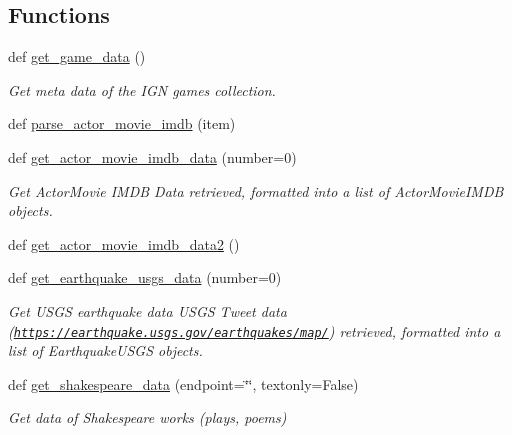 \subsection*{Functions}
\begin{DoxyCompactItemize}
\item 
def \hyperlink{namespacebridges_1_1data__src__dependent_1_1data__source_a31b64b8c7a42cdfca0a5f0ae3da187d2}{get\+\_\+game\+\_\+data} ()
\begin{DoxyCompactList}\small\item\em Get meta data of the I\+GN games collection. \end{DoxyCompactList}\item 
def \hyperlink{namespacebridges_1_1data__src__dependent_1_1data__source_adcd1eb0d5e4c80095232e808f34469ad}{parse\+\_\+actor\+\_\+movie\+\_\+imdb} (item)
\item 
def \hyperlink{namespacebridges_1_1data__src__dependent_1_1data__source_a5a685fd00b37b99d63e706289dad9063}{get\+\_\+actor\+\_\+movie\+\_\+imdb\+\_\+data} (number=0)
\begin{DoxyCompactList}\small\item\em Get Actor\+Movie I\+M\+DB Data retrieved, formatted into a list of Actor\+Movie\+I\+M\+DB objects. \end{DoxyCompactList}\item 
def \hyperlink{namespacebridges_1_1data__src__dependent_1_1data__source_a279aa1a757f4838f3d048651cb1a7d26}{get\+\_\+actor\+\_\+movie\+\_\+imdb\+\_\+data2} ()
\item 
def \hyperlink{namespacebridges_1_1data__src__dependent_1_1data__source_a0d2a8b28fa0fa79440112d02ca9cd7fc}{get\+\_\+earthquake\+\_\+usgs\+\_\+data} (number=0)
\begin{DoxyCompactList}\small\item\em Get U\+S\+GS earthquake data U\+S\+GS Tweet data (\href{https://earthquake.usgs.gov/earthquakes/map/}{\tt https\+://earthquake.\+usgs.\+gov/earthquakes/map/}) retrieved, formatted into a list of Earthquake\+U\+S\+GS objects. \end{DoxyCompactList}\item 
def \hyperlink{namespacebridges_1_1data__src__dependent_1_1data__source_a141593343ceef42e35072b3151a8b2db}{get\+\_\+shakespeare\+\_\+data} (endpoint=\char`\"{}\char`\"{}, textonly=False)
\begin{DoxyCompactList}\small\item\em Get data of Shakespeare works (plays, poems) \end{DoxyCompactList}\item 

\end{DoxyCompactItemize}
